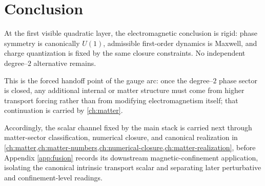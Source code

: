\section{Conclusion}
\label{sec:em-conclusion}
At the first visible quadratic layer, the electromagnetic conclusion is
rigid: phase symmetry is canonically \(U(1)\), admissible first-order
dynamics is Maxwell, and charge quantization is fixed by the same closure
constraints. No independent degree--\(2\) alternative remains.

This is the forced handoff point of the gauge arc: once the degree--\(2\)
phase sector is closed, any additional internal or matter structure must
come from higher transport forcing rather than from modifying
electromagnetism itself; that continuation is carried by
\cref{ch:matter}.

Accordingly, the scalar channel fixed by the main stack is carried
next through matter-sector classification, numerical closure, and
canonical realization in
\cref{ch:matter,ch:matter-numbers,ch:numerical-closure,ch:matter-realization},
before Appendix \cref{app:fusion} records its downstream
magnetic-confinement application, isolating the canonical intrinsic
transport scalar and separating later perturbative and
confinement-level readings.

\begin{chapterclosing}
\end{chapterclosing}
